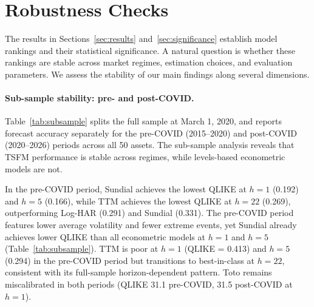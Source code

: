 \documentclass[12pt]{article}
\begin{document}
\section{Robustness Checks}
\label{sec:robustness}

The results in Sections~\ref{sec:results} and~\ref{sec:significance} establish model rankings and their statistical significance. A natural question is whether these rankings are stable across market regimes, estimation choices, and evaluation parameters. We assess the stability of our main findings along several dimensions.


\paragraph{Sub-sample stability: pre- and post-COVID.}
Table~\ref{tab:subsample} splits the full sample at March 1, 2020, and reports forecast accuracy separately for the pre-COVID (2015--2020) and post-COVID (2020--2026) periods across all 50 assets. The sub-sample analysis reveals that TSFM performance is stable across regimes, while levels-based econometric models are not.

In the pre-COVID period, Sundial achieves the lowest QLIKE at $h=1$ (0.192) and $h=5$ (0.166), while TTM achieves the lowest QLIKE at $h=22$ (0.269), outperforming Log-HAR (0.291) and Sundial (0.331). The pre-COVID period features lower average volatility and fewer extreme events, yet Sundial already achieves lower QLIKE than all econometric models at $h = 1$ and $h = 5$ (Table~\ref{tab:subsample}). TTM is poor at $h = 1$ (QLIKE = 0.413) and $h = 5$ (0.294) in the pre-COVID period but transitions to best-in-class at $h = 22$, consistent with its full-sample horizon-dependent pattern. Toto remains miscalibrated in both periods (QLIKE 31.1 pre-COVID, 31.5 post-COVID at $h=1$).
\end{document}
